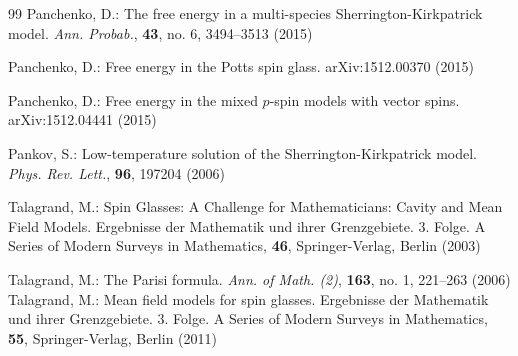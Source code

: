 \documentclass[12pt]{article}
\newenvironment{Proof of lemma}{\noindent{\bf Proof of Lemma}}{\hfill$\Box$\newline}
\newenvironment{Proof of theorem}{\noindent{\bf Proof of Theorem}}{\hfill{\footnotesize${\square}$}\newline}
\newenvironment{Proof of theorems}{\noindent{\bf Proof of Theorems}}{\hfill$\Box$\newline}
\newenvironment{Proof of proposition}{\noindent{\bf Proof of Proposition}}{\hfill$\Box$\newline}
\newenvironment{Proof of propositions}{\noindent{\bf Proof of Propositions}}{\hfill$\Box$\newline}
\newenvironment{Proof of exercise}{\noindent{\it Proof of Exercise:}}{\hfill$\Box$}
\begin{document}
\begin{thebibliography}{99}
  		Panchenko, D.: The free energy in a multi-species Sherrington-Kirkpatrick model. {\it Ann. Probab.}, {\bf 43}, no. 6, 3494--3513 (2015)
  		
  		Panchenko, D.: Free energy in the Potts spin glass. arXiv:1512.00370 (2015)
  		
  		Panchenko, D.: Free energy in the mixed $p$-spin models with vector spins. arXiv:1512.04441 (2015) 
  		
		 Pankov, S.: Low-temperature solution of the Sherrington-Kirkpatrick model.  {\it Phys. Rev. Lett.}, {\bf 96}, 197204 (2006)
		
%  		
%  		
%  		
  		Talagrand, M.: Spin Glasses: A Challenge for Mathematicians: Cavity and Mean Field Models. Ergebnisse der Mathematik und ihrer Grenzgebiete. 3. Folge. A Series of Modern Surveys in Mathematics, {\bf 46}, Springer-Verlag, Berlin (2003)
  		
  		Talagrand, M.: The Parisi formula. {\it Ann. of Math. (2)}, {\bf 163}, no. 1, 221--263 (2006)
%  		
%  		
			Talagrand, M.: Mean field models for spin glasses. Ergebnisse der Mathematik und ihrer Grenzgebiete. 3. Folge. A Series of Modern Surveys in Mathematics, {\bf 55}, Springer-Verlag, Berlin (2011)
  		
  	\end{thebibliography}
\end{document}
